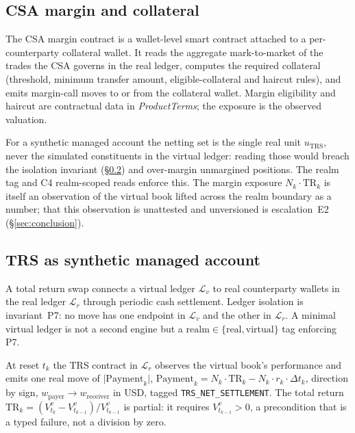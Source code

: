 \subsection{CSA margin and collateral}
\label{sec:sec09-csa}

The CSA margin contract is a wallet-level smart contract attached to a per-counterparty collateral
wallet. It reads the aggregate mark-to-market of the trades the CSA governs in the real ledger,
computes the required collateral (threshold, minimum transfer amount, eligible-collateral and
haircut rules), and emits margin-call moves to or from the collateral wallet. Margin eligibility
and haircut are contractual data in \textit{ProductTerms}; the exposure is the observed valuation.

For a synthetic managed account the netting set is the single real unit $u_{\mathrm{TRS}}$, never
the simulated constituents in the virtual ledger: reading those would breach the isolation
invariant (\S\ref{sec:sec09-trs}) and over-margin unmargined positions. The realm tag and C4
realm-scoped reads enforce this. The margin exposure $N_k\cdot\mathrm{TR}_k$ is itself an
observation of the virtual book lifted across the realm boundary as a number; that this
observation is unattested and unversioned is escalation~E2 (\S\ref{sec:conclusion}).

\subsection{TRS as synthetic managed account}
\label{sec:sec09-trs}

A total return swap connects a virtual ledger $\mathcal{L}_v$ to real counterparty wallets in the
real ledger $\mathcal{L}_r$ through periodic cash settlement. Ledger isolation is invariant~P7: no
move has one endpoint in $\mathcal{L}_v$ and the other in $\mathcal{L}_r$. A minimal virtual
ledger is not a second engine but a $\mathrm{realm}\in\{\text{real},\text{virtual}\}$ tag enforcing
P7.

At reset $t_k$ the TRS contract in $\mathcal{L}_r$ observes the virtual book's performance and
emits one real move of $\big|\mathrm{Payment}_k\big|$,
$\mathrm{Payment}_k=N_k\cdot\mathrm{TR}_k-N_k\cdot r_k\cdot\Delta t_k$, direction by sign,
$w_{\text{payer}}\to w_{\text{receiver}}$ in USD, tagged \texttt{TRS\_NET\_SETTLEMENT}. The total
return $\mathrm{TR}_k=(V^v_{t_k}-V^v_{t_{k-1}})/V^v_{t_{k-1}}$ is partial: it requires
$V^v_{t_{k-1}}>0$, a precondition that is a typed failure, not a division by zero.

